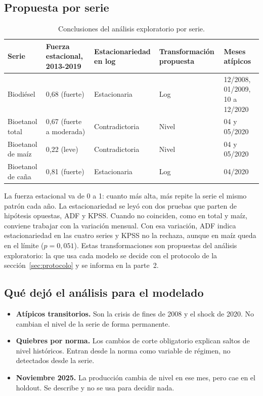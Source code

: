 \documentclass[11pt,a4paper]{article}
\begin{document}
\subsection{Propuesta por serie}

\begin{table}[htbp]
\centering\footnotesize
\begin{tabularx}{\textwidth}{@{}P{2.3cm}P{2.5cm}P{2.6cm}P{2.7cm}L@{}}
\toprule
\textbf{Serie} & \textbf{Fuerza estacional, 2013-2019} & \textbf{Estacionariedad en log} & \textbf{Transformación propuesta} & \textbf{Meses atípicos}\\
\midrule
Biodiésel & 0,68 (fuerte) & Estacionaria & Log & 12/2008, 01/2009, 10 a 12/2020\\
Bioetanol total & 0,67 (fuerte a moderada) & Contradictoria & Nivel & 04 y 05/2020\\
Bioetanol de maíz & 0,22 (leve) & Contradictoria & Nivel & 04 y 05/2020\\
Bioetanol de caña & 0,81 (fuerte) & Estacionaria & Log & 04/2020\\
\bottomrule
\end{tabularx}
\caption{Conclusiones del análisis exploratorio por serie.}
\end{table}

La fuerza estacional va de 0 a 1: cuanto más alta, más repite la serie el mismo patrón cada año. La estacionariedad se leyó con dos pruebas que parten de hipótesis opuestas, ADF y KPSS. Cuando no coinciden, como en total y maíz, conviene trabajar con la variación mensual. Con esa variación, ADF indica estacionariedad en las cuatro series y KPSS no la rechaza, aunque en maíz queda en el límite ($p = 0{,}051$). Estas transformaciones son propuestas del análisis exploratorio: la que usa cada modelo se decide con el protocolo de la sección~\ref{sec:protocolo} y se informa en la parte~2.

\subsection{Qué dejó el análisis para el modelado}

\begin{itemize}
  \item \textbf{Atípicos transitorios.} Son la crisis de fines de 2008 y el shock de 2020. No cambian el nivel de la serie de forma permanente.
  \item \textbf{Quiebres por norma.} Los cambios de corte obligatorio explican saltos de nivel históricos. Entran desde la norma como variable de régimen, no detectados desde la serie.
  \item \textbf{Noviembre 2025.} La producción cambia de nivel en ese mes, pero cae en el holdout. Se describe y no se usa para decidir nada.
\end{itemize}
\end{document}
